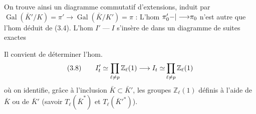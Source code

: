 On trouve ainsi un diagramme commutatif d'extensions, induit par $\operatorname{Gal}(\bar K'/K)=\pi'\longrightarrow\operatorname{Gal}(\bar K/K')=\pi$ :
L'hom $\pi'_0{-|\longrightarrow}\pi_0$ n'est autre que l'hom
déduit de (3.4). L'hom $I'\mathrel{\text{---}}I$ s'insère de  dans un diagramme de suites exactes

Il convient de déterminer l'hom.
\[
(3.8)\qquad I'_t\simeq\prod_{\ell\ne{p}}\mathbb Z_\ell(1)\longrightarrow{I_t\simeq}\prod_{\ell\ne p}\mathbb Z_\ell(1)
\]
où on identifie, grâce à l'inclusion $\bar K\subset\bar K'$, les  groupes $\mathbb Z_\ell(1)$ définis à l'aide de $\bar K$ ou de $\bar K'$ (savoir $T_\ell(\bar K^*)$ et $T_\ell(\bar K'^*)$).

